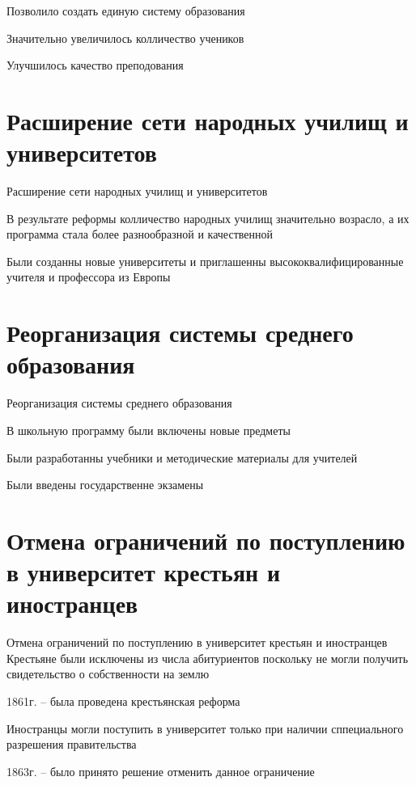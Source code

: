 \begin{frame}
	\Large{
	Позволило создать единую систему образования

	Значительно увеличилось колличество учеников

	Улучшилось качество преподования}
\end{frame}


\section{Расширение сети народных училищ и университетов}
\begin{frame}{Расширение сети народных училищ и университетов}

	\Large{В результате реформы колличество народных училищ значительно возрасло, а их программа стала более разнообразной и качественной}

\end{frame}

\begin{frame}{}

	\Large{Были созданны новые университеты и приглашенны высококвалифицированные учителя и профессора из Европы}

\end{frame}
\section{Реорганизация системы среднего образования}
\begin{frame}{Реорганизация системы среднего образования}

	\Large{В школьную программу были включены новые предметы

	Были разработанны учебники и методические материалы для учителей

	Были введены государственне экзамены}

\end{frame}

\section{Отмена ограничений по поступлению в университет крестьян и иностранцев}
\begin{frame}{Отмена ограничений по поступлению в университет крестьян и иностранцев}
	Крестьяне были исключены из числа абитуриентов поскольку не могли получить свидетельство о собственности на землю

	1861г. -- была проведена крестьянская реформа

	Иностранцы могли поступить в университет только при наличии сппециального разрешения правительства

	1863г. -- было принято решение отменить данное ограничение
\end{frame}

